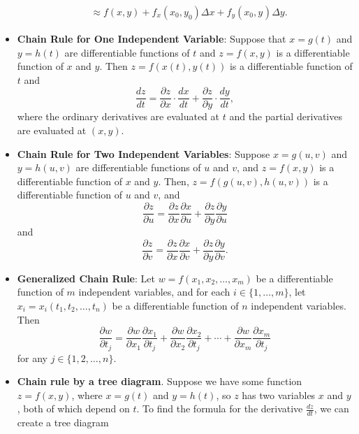 \documentclass{report}
\begin{document}
\begin{itemize}
\begin{align*}
            &\approx f(x,y) +f_{x}(x_{0},y_{0})\Delta x + f_{y}(x_{0}, y_{})\Delta y
        .\end{align*}
    \item \textbf{Chain Rule for One Independent Variable}:
        Suppose that \(x = g(t)\) and \(y = h(t)\) are differentiable functions of \(t\) and \(z = f(x,y)\) is a differentiable function of \(x\) and \(y\). Then \(z = f(x(t), y(t))\) is a differentiable function of \(t\) and
        \[
            \frac{dz}{dt} = \frac{\partial z}{\partial x} \cdot \frac{dx}{dt} + \frac{\partial z}{\partial y} \cdot \frac{dy}{dt},
        \]
        where the ordinary derivatives are evaluated at \(t\) and the partial derivatives are evaluated at \((x,y)\).
    \item \textbf{Chain Rule for Two Independent Variables}:
        Suppose \(x = g(u,v)\) and \(y = h(u,v)\) are differentiable functions of \(u\) and \(v\), and \(z = f(x,y)\) is a differentiable function of \(x\) and \(y\). Then, \(z = f(g(u,v),h(u,v))\) is a differentiable function of \(u\) and \(v\), and
        \[
            \frac{\partial z}{\partial u} = \frac{\partial z}{\partial x} \frac{\partial x}{\partial u} + \frac{\partial z}{\partial y} \frac{\partial y}{\partial u}
        \]
        and
        \[
            \frac{\partial z}{\partial v} = \frac{\partial z}{\partial x} \frac{\partial x}{\partial v} + \frac{\partial z}{\partial y} \frac{\partial y}{\partial v}.
        \]
    \item \textbf{Generalized Chain Rule}:
        Let \(w = f(x_1, x_2, \ldots, x_m)\) be a differentiable function of \(m\) independent variables, and for each \(i \in \{1, \ldots, m\}\), let \(x_i = x_i(t_1, t_2, \ldots, t_n)\) be a differentiable function of \(n\) independent variables. Then
        \[
            \frac{\partial w}{\partial t_j} = \frac{\partial w}{\partial x_1} \frac{\partial x_1}{\partial t_j} + \frac{\partial w}{\partial x_2} \frac{\partial x_2}{\partial t_j} + \cdots + \frac{\partial w}{\partial x_m} \frac{\partial x_m}{\partial t_j}
        \]
        for any \(j \in \{1, 2, \ldots, n\}\).
    \item \textbf{Chain rule by a tree diagram}. Suppose we have some function $z=f(x,y)$, where $x=g(t)$ and $y=h(t)$, so $z$ has two variables $x$ and $y$, both of which depend on $t$. To find the formula for the derivative $\frac{dz}{dt}$, we can create a tree diagram
        \bigbreak \noindent 
    \begin{figure}[ht]
        \centering
        \label{fig:tree}

\end{figure}
\end{itemize}
\end{document}
